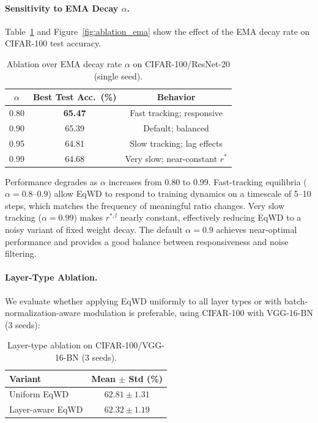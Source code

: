 \documentclass{article}
\begin{document}
\paragraph{Sensitivity to EMA Decay $\alpha$.}
Table~\ref{tab:ablation_ema} and Figure~\ref{fig:ablation_ema} show the effect of the EMA
decay rate on CIFAR-100 test accuracy.

\begin{table}[t]
\centering
\caption{Ablation over EMA decay rate $\alpha$ on CIFAR-100/ResNet-20 (single seed).}
\label{tab:ablation_ema}
\small
\begin{tabular}{ccc}
\toprule
$\alpha$ & Best Test Acc.\ (\%) & Behavior \\
\midrule
0.80 & \textbf{65.47} & Fast tracking; responsive \\
0.90 & 65.39 & Default; balanced \\
0.95 & 64.81 & Slow tracking; lag effects \\
0.99 & 64.68 & Very slow; near-constant $r^*$ \\
\bottomrule
\end{tabular}
\end{table}

Performance degrades as $\alpha$ increases from 0.80 to 0.99.
Fast-tracking equilibria ($\alpha = 0.8$--$0.9$) allow EqWD to
respond to training dynamics on a timescale of 5--10 steps, which
matches the frequency of meaningful ratio changes. Very slow tracking
($\alpha = 0.99$) makes $r^{*,l}$ nearly constant, effectively
reducing EqWD to a noisy variant of fixed weight decay. The default
$\alpha = 0.9$ achieves near-optimal performance and provides a good
balance between responsiveness and noise filtering.

\paragraph{Layer-Type Ablation.}
We evaluate whether applying EqWD uniformly to all layer types or with
batch-normalization-aware modulation is preferable, using CIFAR-100 with
VGG-16-BN (3 seeds):

\begin{table}[t]
\centering
\caption{Layer-type ablation on CIFAR-100/VGG-16-BN (3 seeds).}
\label{tab:ablation_layertype}
\small
\begin{tabular}{lc}
\toprule
Variant & Mean $\pm$ Std (\%) \\
\midrule
Uniform EqWD & $62.81 \pm 1.31$ \\
Layer-aware EqWD & $62.32 \pm 1.19$ \\
\bottomrule
\end{tabular}
\end{table}
\end{document}
